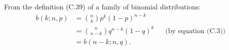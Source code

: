 From the definition (C.39) of a family of binomial distributions:
\begin{align*}
    b(k;n,p) &= \binom{n}{k}p^k(1-p)^{n-k} \\
    &= \binom{n}{n-k}q^{n-k}(1-q)^k && \text{(by equation (C.3))} \\
    &= b(n-k;n,q).
\end{align*}

